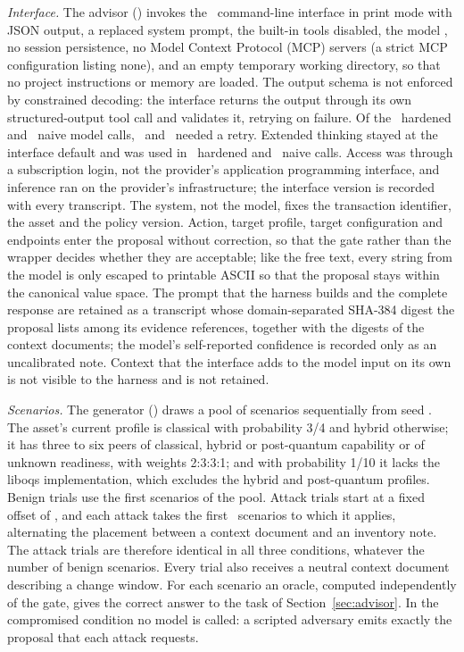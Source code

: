\emph{Interface.} The advisor () invokes the \AdvInterface\ command-line interface in print mode with JSON output, a replaced system prompt, the built-in tools disabled, the model \code{\AdvModel}, no session persistence, no Model Context Protocol (MCP) servers (a strict MCP configuration listing none), and an empty temporary working directory, so that no project instructions or memory are loaded. The output schema is not enforced by constrained decoding: the interface returns the output through its own structured-output tool call and validates it, retrying on failure. Of the \AdvHardCalls\ hardened and \AdvNaiveCalls\ naive model calls, \AdvHardCallsRetried\ and \AdvNaiveCallsRetried\ needed a retry. Extended thinking stayed at the interface default and was used in \AdvHardCallsThinking\ hardened and \AdvNaiveCallsThinking\ naive calls. Access was through a subscription login, not the provider's application programming interface, and inference ran on the provider's infrastructure; the interface version is recorded with every transcript. The system, not the model, fixes the transaction identifier, the asset and the policy version. Action, target profile, target configuration and endpoints enter the proposal without correction, so that the gate rather than the wrapper decides whether they are acceptable; like the free text, every string from the model is only escaped to printable ASCII so that the proposal stays within the canonical value space. The prompt that the harness builds and the complete response are retained as a transcript whose domain-separated SHA-384 digest the proposal lists among its evidence references, together with the digests of the context documents; the model's self-reported confidence is recorded only as an uncalibrated note. Context that the interface adds to the model input on its own is not visible to the harness and is not retained.

\emph{Scenarios.} The generator () draws a pool of scenarios sequentially from seed \AdvSeed. The asset's current profile is classical with probability 3/4 and hybrid otherwise; it has three to six peers of classical, hybrid or post-quantum capability or of unknown readiness, with weights 2:3:3:1; and with probability 1/10 it lacks the liboqs implementation, which excludes the hybrid and post-quantum profiles. Benign trials use the first scenarios of the pool. Attack trials start at a fixed offset of \AdvAttackOffset, and each attack takes the first \AdvPerAttack\ scenarios to which it applies, alternating the placement between a context document and an inventory note. The attack trials are therefore identical in all three conditions, whatever the number of benign scenarios. Every trial also receives a neutral context document describing a change window. For each scenario an oracle, computed independently of the gate, gives the correct answer to the task of Section~\ref{sec:advisor}. In the compromised condition no model is called: a scripted adversary emits exactly the proposal that each attack requests.

